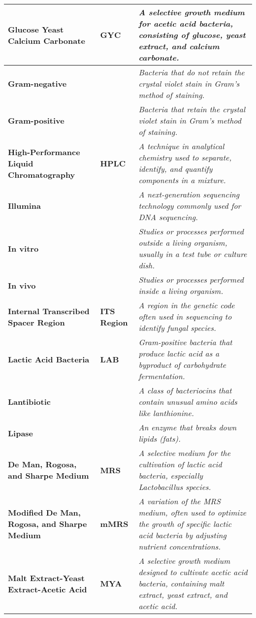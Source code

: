 \begin{longtable}{| p{5cm} | p{2cm} | p{7.5cm} |}
    \hline
    \textbf{Glucose Yeast Calcium Carbonate} & \textbf{GYC} & \textit{A selective growth medium for acetic acid bacteria, consisting of glucose, yeast extract, and calcium carbonate.} \\
    \hline
    \textbf{Gram-negative} &  & \textit{Bacteria that do not retain the crystal violet stain in Gram's method of staining.} \\
    \hline
    \textbf{Gram-positive} &  & \textit{Bacteria that retain the crystal violet stain in Gram's method of staining.} \\
    \hline
    \textbf{High-Performance Liquid Chromatography} & \textbf{HPLC} & \textit{A technique in analytical chemistry used to separate, identify, and quantify components in a mixture.} \\
    \hline
    \textbf{Illumina} &  & \textit{A next-generation sequencing technology commonly used for DNA sequencing.} \\
    \hline
    \textbf{In vitro} &  & \textit{Studies or processes performed outside a living organism, usually in a test tube or culture dish.} \\
    \hline
    \textbf{In vivo} &  & \textit{Studies or processes performed inside a living organism.} \\
    \hline
    \textbf{Internal Transcribed Spacer Region} & \textbf{ITS Region} & \textit{A region in the genetic code often used in sequencing to identify fungal species.} \\
    \hline
    \textbf{Lactic Acid Bacteria} & \textbf{LAB} & \textit{Gram-positive bacteria that produce lactic acid as a byproduct of carbohydrate fermentation.} \\
    \hline
    \textbf{Lantibiotic} &  & \textit{A class of bacteriocins that contain unusual amino acids like lanthionine.} \\
    \hline
    \textbf{Lipase} &  & \textit{An enzyme that breaks down lipids (fats).} \\
    \hline
    \textbf{De Man, Rogosa, and Sharpe Medium} & \textbf{MRS} & \textit{A selective medium for the cultivation of lactic acid bacteria, especially \textit{Lactobacillus} species.} \\
    \hline
    \textbf{Modified De Man, Rogosa, and Sharpe Medium} & \textbf{mMRS} & \textit{A variation of the MRS medium, often used to optimize the growth of specific lactic acid bacteria by adjusting nutrient concentrations.} \\
    \hline
    \textbf{Malt Extract-Yeast Extract-Acetic Acid} & \textbf{MYA} & \textit{A selective growth medium designed to cultivate acetic acid bacteria, containing malt extract, yeast extract, and acetic acid.} \\

\end{longtable}

